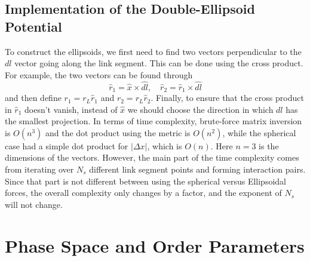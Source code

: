 \documentclass[nofootinbib,preprint,floatfix,titlepage,superscriptaddress]{revtex4} %
\begin{document}
\subsection{Implementation of the Double-Ellipsoid Potential}
To construct the ellipsoids, we first need to find two vectors perpendicular to the $dl$ vector going along the link segment. This can be done using the cross product.
For example, the two vectors can be found through 
\begin{equation}
    \hat{r}_1 = \hat{x} \times \hat{dl}, \quad \hat{r}_2 = \hat{r}_1 \times \hat{dl} 
    \label{eq:r12}
\end{equation}
and then define $r_1 = r_L \hat{r}_1$ and $r_2 = r_L \hat{r}_2$. Finally, to ensure that the cross product in $\hat{r}_1$ doesn't vanish, instead of $\hat{x}$ we should choose the direction in which $dl$ has the smallest projection. 
In terms of time complexity, brute-force matrix inversion is $O(n^3)$ and the dot product using the metric is $O(n^2)$, while the spherical case had a simple dot product for $|\Delta x|$, which is $O(n)$. Here $n=3$ is the dimensions of the vectors. 
However, the main part of the time complexity comes from iterating over $N_s$ different link segment points and forming interaction pairs. 
Since that part is not different between using the spherical versus Ellipsoidal forces, the overall complexity only changes by a factor, and the exponent of $N_s$ will not change.

\section{Phase Space and Order Parameters\label{ap:phase}}
\end{document}
